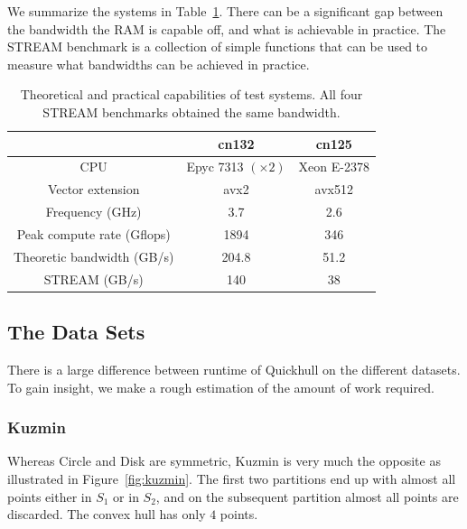 We summarize the systems in Table~\ref{tab:system}. There can be a significant
gap between the bandwidth the RAM is capable off, and what is achievable in
practice. The STREAM benchmark \cite{} is a collection of simple functions
that can be used to measure what bandwidths can be achieved in practice.

\begin{table}
    \caption{Theoretical and practical capabilities of test systems. All four
             STREAM benchmarks obtained the same bandwidth.}
    \label{tab:system}
    \begin{tabular}{c|c|c}
                                   & cn132 & cn125          \\
        \hline                                              
        CPU                        & Epyc 7313 $(\times 2)$ 
                                           & Xeon E-2378    \\
        Vector extension           & avx2  & avx512         \\
        Frequency (GHz)            & 3.7   & 2.6            \\
        Peak compute rate (Gflops) & 1894  & 346            \\
        Theoretic bandwidth (GB/s) & 204.8 & 51.2           \\ 
        STREAM (GB/s)              & 140   & 38             \\ 
    \end{tabular}
\end{table}

\subsection{The Data Sets}\label{subsec:datasets}

There is a large difference between runtime of Quickhull on the different 
datasets.
To gain insight, we make a rough estimation of the amount of work required.

\subsubsection{Kuzmin}

Whereas Circle and Disk are symmetric, Kuzmin is very much the opposite
as illustrated in Figure~\ref{fig:kuzmin}.
The first two partitions end up with almost all points either in $S_1$ or
in $S_2$, and on the subsequent partition almost all points are discarded.
The convex hull has only $4$ points.

